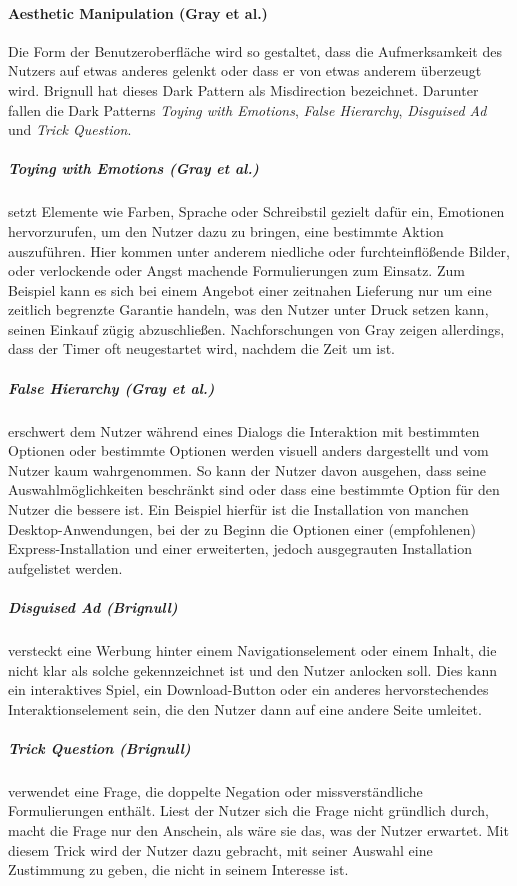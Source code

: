 \documentclass[a4paper]{article}
\newcommand{\todo}[1]{{\color{purple}{#1}}}
\begin{document}
\paragraph{Aesthetic Manipulation (Gray et al.)}
Die Form der Benutzeroberfläche wird so gestaltet, dass die Aufmerksamkeit des Nutzers auf etwas anderes gelenkt oder dass er von etwas anderem überzeugt wird. Brignull hat dieses Dark Pattern als \glqq Misdirection\grqq{} bezeichnet. 
Darunter fallen die Dark Patterns \textit{Toying with Emotions}, \textit{False Hierarchy}, \textit{Disguised Ad} und \textit{Trick Question}.

\subparagraph{Toying with Emotions (Gray et al.)} 
setzt Elemente wie Farben, Sprache oder Schreibstil gezielt dafür ein, Emotionen hervorzurufen, um den Nutzer dazu zu bringen, eine bestimmte Aktion auszuführen. Hier kommen unter anderem niedliche \todo{zu viel oder XD} oder furchteinflößende Bilder, oder verlockende oder Angst machende Formulierungen zum Einsatz. Zum Beispiel kann es sich bei einem Angebot einer zeitnahen Lieferung nur um eine zeitlich begrenzte Garantie handeln, was den Nutzer unter Druck setzen kann, seinen Einkauf zügig abzuschließen. Nachforschungen von Gray zeigen allerdings, dass der Timer oft neugestartet wird, nachdem die Zeit um ist. 

\subparagraph{False Hierarchy (Gray et al.)}
erschwert dem Nutzer während eines Dialogs die Interaktion mit bestimmten Optionen oder bestimmte Optionen werden visuell anders dargestellt und vom Nutzer kaum wahrgenommen. So kann der Nutzer davon ausgehen, dass seine Auswahlmöglichkeiten beschränkt sind oder dass eine bestimmte Option für den Nutzer die bessere ist. Ein Beispiel hierfür ist die Installation von manchen Desktop-Anwendungen, bei der zu Beginn die Optionen einer (empfohlenen) Express-Installation und einer erweiterten, jedoch ausgegrauten Installation aufgelistet werden.

\subparagraph{Disguised Ad (Brignull)}
versteckt eine Werbung hinter einem Navigationselement oder einem Inhalt, die nicht klar als solche gekennzeichnet ist und den Nutzer anlocken soll.
Dies kann ein interaktives Spiel, ein Download-Button oder ein anderes hervorstechendes Interaktionselement sein, die den Nutzer dann auf eine andere Seite umleitet.

\subparagraph{Trick Question (Brignull)}
verwendet eine Frage, die doppelte Negation oder missverständliche Formulierungen enthält. Liest der Nutzer sich die Frage nicht gründlich durch, macht die Frage nur den Anschein, als wäre sie das, was der Nutzer erwartet. Mit diesem Trick wird der Nutzer dazu gebracht, mit seiner Auswahl eine Zustimmung zu geben, die nicht in seinem Interesse ist. 
\end{document}
